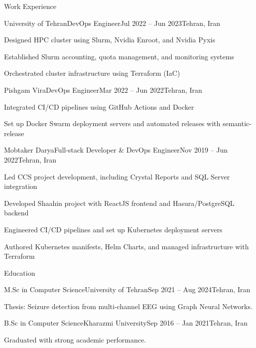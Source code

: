 \documentclass[]{main}
\begin{document}
\begin{section}{Work Experience}
 \begin{subsection}{University of Tehran}{DevOps Engineer}{Jul 2022 -- Jun 2023}{Tehran, Iran}
     \item Designed HPC cluster using Slurm, Nvidia Enroot, and Nvidia Pyxis
     \item Established Slurm accounting, quota management, and monitoring systems
     \item Orchestrated cluster infrastructure using Terraform (IaC)
 \end{subsection}

 \begin{subsection}{Pishgam Vira}{DevOps Engineer}{Mar 2022 -- Jun 2022}{Tehran, Iran}
     \item Integrated CI/CD pipelines using GitHub Actions and Docker
     \item Set up Docker Swarm deployment servers and automated releases with semantic-release
 \end{subsection}

 \begin{subsection}{Mobtaker Darya}{Full-stack Developer \& DevOps Engineer}{Nov 2019 -- Jun 2022}{Tehran, Iran}
     \item Led CCS project development, including Crystal Reports and SQL Server integration
     \item Developed Shaahin project with ReactJS frontend and Hasura/PostgreSQL backend
     \item Engineered CI/CD pipelines and set up Kubernetes deployment servers
     \item Authored Kubernetes manifests, Helm Charts, and managed infrastructure with Terraform
 \end{subsection}
\end{section}

\newpage

\begin{section}{Education}
 \begin{subsectionnobullet}{M.Sc in Computer Science}{University of Tehran}{Sep 2021 -- Aug 2024}{Tehran, Iran}
     \item Thesis: Seizure detection from multi-channel EEG using Graph Neural Networks.
 \end{subsectionnobullet}
 \begin{subsectionnobullet}{B.Sc in Computer Science}{Kharazmi University}{Sep 2016 -- Jan 2021}{Tehran, Iran}
     \item Graduated with strong academic performance.
 \end{subsectionnobullet}
\end{section}
\end{document}
